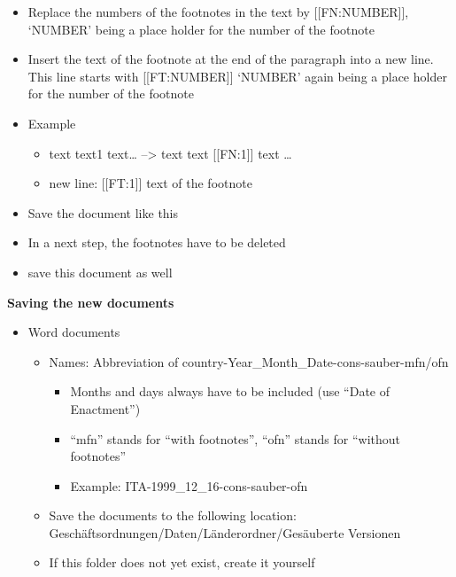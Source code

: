 \documentclass[10pt,]{article}
\providecommand{\tightlist}{%
  \setlength{\itemsep}{0pt}\setlength{\parskip}{0pt}}
\begin{document}
\begin{itemize}
\begin{itemize}
    \begin{itemize}
    \tightlist
    \item
      Replace the numbers of the footnotes in the text by
      {[}{[}FN:NUMBER{]}{]}, `NUMBER' being a place holder for the
      number of the footnote
    \item
      Insert the text of the footnote at the end of the paragraph into a
      new line. This line starts with {[}{[}FT:NUMBER{]}{]} `NUMBER'
      again being a place holder for the number of the footnote
    \item
      Example

      \begin{itemize}
      \tightlist
      \item
        text text1 text\ldots{} --\textgreater{} text text
        {[}{[}FN:1{]}{]} text \ldots{}
      \item
        new line: {[}{[}FT:1{]}{]} text of the footnote
      \end{itemize}
    \item
      Save the document like this
    \item
      In a next step, the footnotes have to be deleted
    \item
      save this document as well
    \end{itemize}
  \end{itemize}
\end{itemize}

\textbf{Saving the new documents}

\begin{itemize}
\tightlist
\item
  Word documents

  \begin{itemize}
  \tightlist
  \item
    Names: Abbreviation of country-Year\_Month\_Date-cons-sauber-mfn/ofn

    \begin{itemize}
    \tightlist
    \item
      Months and days always have to be included (use ``Date of
      Enactment'')
    \item
      ``mfn'' stands for ``with footnotes'', ``ofn'' stands for
      ``without footnotes''
    \item
      Example: ITA-1999\_12\_16-cons-sauber-ofn
    \end{itemize}
  \item
    Save the documents to the following location:
    Geschäftsordnungen/Daten/Länderordner/Gesäuberte Versionen
  \item
    If this folder does not yet exist, create it yourself
  \end{itemize}
\end{itemize}
\end{document}

